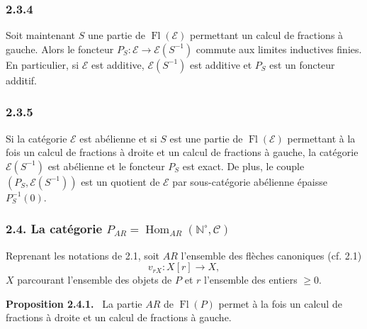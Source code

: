\documentclass[11pt]{article}
\providecommand{\NN}{\mathbb{N}}
\newenvironment{statement}[1]{\par\medskip\noindent\textbf{#1.}\ }{\par\medskip}
\DeclareMathOperator{\Hom}{Hom}
\providecommand{\Hom}{\operatorname{Hom}}
\providecommand{\Fl}{\operatorname{Fl}}
\providecommand{\NN}{\mathbb N}
\providecommand{\cC}{\mathcal C}
\providecommand{\cE}{\mathcal E}
\providecommand{\cC}{\mathcal C}
\providecommand{\Hom}{\operatorname{Hom}}
\begin{document}
\subsubsection*{2.3.4}
Soit maintenant $S$ une partie de $\Fl(\cE)$ permettant un calcul de fractions à gauche. Alors le foncteur $P_S:\cE\to\cE(S^{-1})$ commute aux limites inductives finies. En particulier, si $\cE$ est additive, $\cE(S^{-1})$ est additive et $P_S$ est un foncteur additif.

\subsubsection*{2.3.5}
Si la catégorie $\cE$ est abélienne et si $S$ est une partie de $\Fl(\cE)$ permettant à la fois un calcul de fractions à droite et un calcul de fractions à gauche, la catégorie $\cE(S^{-1})$ est abélienne et le foncteur $P_S$ est exact. De plus, le couple $(P_S,\cE(S^{-1}))$ est un quotient de $\cE$ par sous-catégorie abélienne épaisse $P_S^{-1}(0)$.

\subsubsection*{2.4. La catégorie $P_{AR}=\Hom_{AR}(\NN^\circ,\cC)$}
Reprenant les notations de 2.1, soit $AR$ l'ensemble des flèches canoniques (cf. 2.1)
\[
v_{rX}:X[r]\longrightarrow X,
\]
$X$ parcourant l'ensemble des objets de $P$ et $r$ l'ensemble des entiers $\ge0$.

\begin{statement}{Proposition 2.4.1}
La partie $AR$ de $\Fl(P)$ permet à la fois un calcul de fractions à droite et un calcul de fractions à gauche.
\end{statement}
\end{document}

